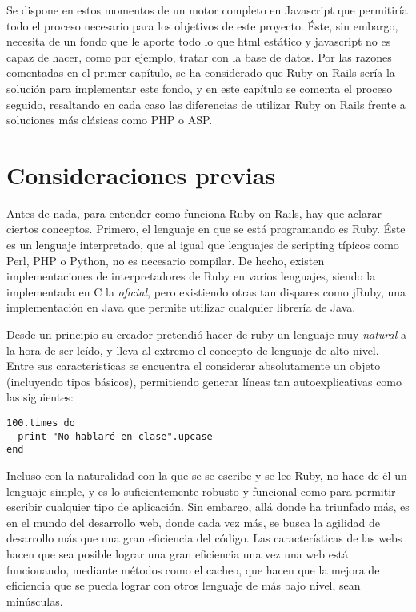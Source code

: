 Se dispone en estos momentos de un motor completo en Javascript que permitiría todo el proceso necesario para los objetivos de este proyecto. Éste, sin embargo, necesita de un fondo que le aporte todo lo que html estático y javascript no es capaz de hacer, como por ejemplo, tratar con la base de datos. Por las razones comentadas en el primer capítulo, se ha considerado que Ruby on Rails sería la solución para implementar este fondo, y en este capítulo se comenta el proceso seguido, resaltando en cada caso las diferencias de utilizar Ruby on Rails frente a soluciones más clásicas como PHP o ASP.

\section{Consideraciones previas} %
\label{sec:ruby_on_rails_consideraciones_previas}
Antes de nada, para entender como funciona Ruby on Rails, hay que aclarar ciertos conceptos. Primero, el lenguaje en que se está programando es Ruby. Éste es un lenguaje interpretado, que al igual que lenguajes de scripting típicos como Perl, PHP o Python, no es necesario compilar. De hecho, existen implementaciones de interpretadores de Ruby en varios lenguajes, siendo la implementada en C la \emph{oficial}, pero existiendo otras tan dispares como jRuby, una implementación en Java que permite utilizar cualquier librería de Java.

Desde un principio su creador pretendió hacer de ruby un lenguaje muy \emph{natural} a la hora de ser leído, y lleva al extremo el concepto de lenguaje de alto nivel. Entre sus características se encuentra el considerar absolutamente un objeto (incluyendo tipos básicos), permitiendo generar líneas tan autoexplicativas como las siguientes:
\begin{verbatim}
100.times do 
  print "No hablaré en clase".upcase
end  
\end{verbatim}

Incluso con la naturalidad con la que se se escribe y se lee Ruby, no hace de él un lenguaje simple, y es lo suficientemente robusto y funcional como para permitir escribir cualquier tipo de aplicación. Sin embargo, allá donde ha triunfado más, es en el mundo del desarrollo web, donde cada vez más, se busca la agilidad de desarrollo más que una gran eficiencia del código. Las características de las webs hacen que sea posible lograr una gran eficiencia una vez una web está funcionando, mediante métodos como el cacheo, que hacen que la mejora de eficiencia que se pueda lograr con otros lenguaje de más bajo nivel, sean minúsculas.

